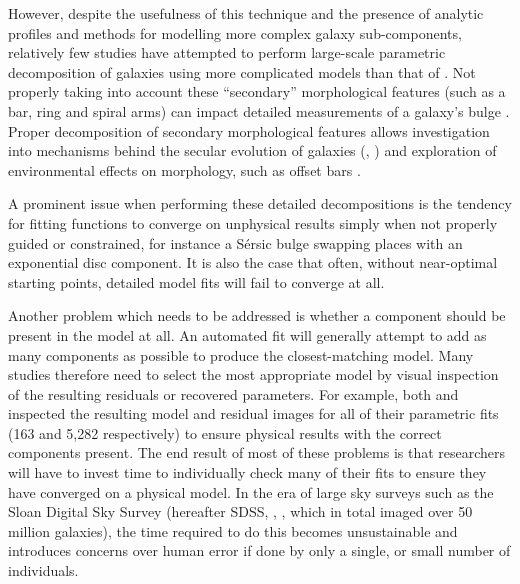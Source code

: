 \documentclass[../main.tex]{subfiles}
\begin{document}
However, despite the usefulness of this technique and the presence of analytic profiles and methods for modelling more complex galaxy sub-components, relatively few studies have attempted to perform large-scale parametric decomposition of galaxies using more complicated models than that of \citet{2011ApJS..196...11S}. Not properly taking into account these ``secondary'' morphological features (such as a bar, ring and spiral arms) can impact detailed measurements of a galaxy's bulge \citep{Gao2017:1709.00746v1}. Proper decomposition of secondary morphological features allows investigation into mechanisms behind the secular evolution of galaxies (\citealt{2018MNRAS.473.4731K}, \citealt{2018ApJ...862..100G}) and exploration of environmental effects on morphology, such as offset bars \citep{2017MNRAS.469.3363K}.

A prominent issue when performing these detailed decompositions is the tendency for fitting functions to converge on unphysical results simply when not properly guided or constrained, for instance a S\'ersic bulge swapping places with an exponential disc component. It is also the case that often, without near-optimal starting points, detailed model fits will fail to converge at all.

Another problem which needs to be addressed is whether a component should be present in the model at all. An automated fit will generally attempt to add as many components as possible to produce the closest-matching model. Many studies therefore need to select the most appropriate model by visual inspection of the resulting residuals or recovered parameters. For example, both \citet{Vika2014:1408.4070v1} and \citet{2018MNRAS.473.4731K} inspected the resulting model and residual images for all of their parametric fits (163 and 5,282 respectively) to ensure physical results with the correct components present. The end result of most of these problems is that researchers will have to invest time to individually check many of their fits to ensure they have converged on a physical model. In the era of large sky surveys such as the Sloan Digital Sky Survey (hereafter SDSS, \citealt{2017AJ....154...28B}, \citealt{SDSSDR7}, which in total imaged over 50 million galaxies), the time required to do this becomes unsustainable and introduces concerns over human error if done by only a single, or small number of individuals.
\end{document}
